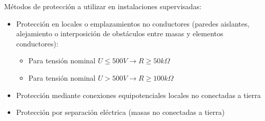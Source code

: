 Métodos de protección a utilizar en instalaciones supervisadas:
\begin{itemize}
	\item Protección en locales o emplazamientos no conductores
	(paredes aislantes, alejamiento o interposición de obstáculos entre
	masas y elementos conductores): 
	\begin{itemize}
		\item Para tensión nominal $U\le 500V \rightarrow R \ge50k\Omega$
		\item Para tensión nominal $U> 500V \rightarrow R \ge 100k\Omega$
	\end{itemize}
	\item Protección mediante conexiones equipotenciales locales no
	conectadas a tierra
	\item Protección por separación eléctrica (masas no conectadas a
	tierra)
\end{itemize}
